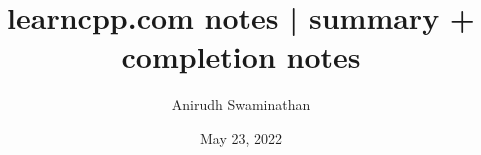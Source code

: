 \documentclass[11pt]{book}
\title{learncpp.com notes | summary + completion notes}
\author{Anirudh Swaminathan}
\date{May 23, 2022}
\begin{document}
\newcommand{\qb}[1]{\ensuremath{|#1\rangle}}
\newcommand{\Z}{\ensuremath{\mathbb{Z}}}
\newcommand{\R}{\ensuremath{\mathbb{R}}}
\newcommand{\C}{\ensuremath{\mathbb{C}}}
\renewcommand{\H}{\ensuremath{\mathbb{H}}}
\newcommand{\tensor}{\ensuremath{\otimes}}
\newcommand{\E}[1]{\mathbb{E}\left[ #1 \right]}
\renewcommand{\l}{\left}
\renewcommand{\r}{\right}
\newcommand{\xor}{\ensuremath{\oplus}}

\maketitle
\tableofcontents
\setcounter{chapter}{-1}



\end{document}
